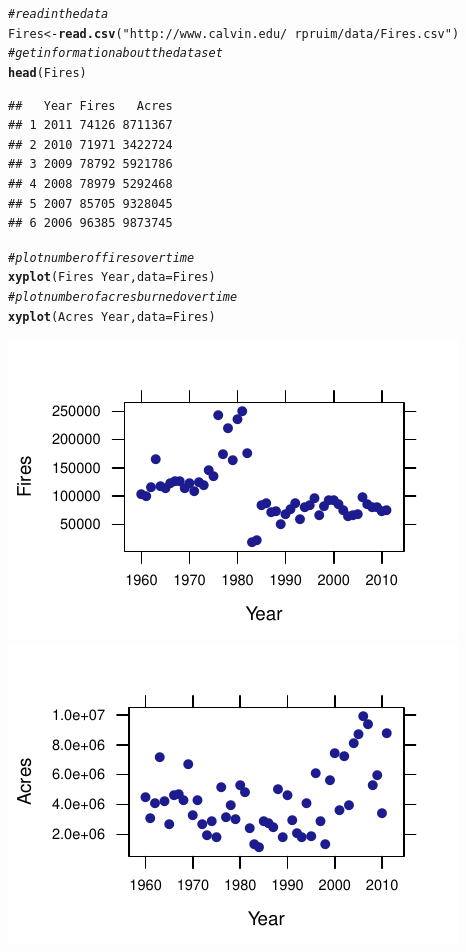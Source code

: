 \documentclass[twoside]{book}\usepackage[]{graphicx}\usepackage[]{xcolor}
\makeatletter
\def\maxwidth{ %
  \ifdim\Gin@nat@width>\linewidth
    \linewidth
  \else
    \Gin@nat@width
  \fi
}
\newcommand{\hlstr}[1]{\textcolor[rgb]{0.192,0.494,0.8}{#1}}%
\newcommand{\hlcom}[1]{\textcolor[rgb]{0.678,0.584,0.686}{\textit{#1}}}%
\newcommand{\hlopt}[1]{\textcolor[rgb]{0,0,0}{#1}}%
\newcommand{\hlstd}[1]{\textcolor[rgb]{0.345,0.345,0.345}{#1}}%
\newcommand{\hlkwb}[1]{\textcolor[rgb]{0.69,0.353,0.396}{#1}}%
\newcommand{\hlkwc}[1]{\textcolor[rgb]{0.333,0.667,0.333}{#1}}%
\newcommand{\hlkwd}[1]{\textcolor[rgb]{0.737,0.353,0.396}{\textbf{#1}}}%
\newenvironment{kframe}{%
 \def\at@end@of@kframe{}%
 \ifinner\ifhmode%
  \def\at@end@of@kframe{\end{minipage}}%
  \begin{minipage}{\columnwidth}%
 \fi\fi%
 \def\FrameCommand##1{\hskip\@totalleftmargin \hskip-\fboxsep
 \colorbox{shadecolor}{##1}\hskip-\fboxsep
     \hskip-\linewidth \hskip-\@totalleftmargin \hskip\columnwidth}%
 \MakeFramed {\advance\hsize-\width
   \@totalleftmargin\z@ \linewidth\hsize
   \@setminipage}}%
 {\par\unskip\endMakeFramed%
 \at@end@of@kframe}
\newenvironment{knitrout}{}{} %
\makeatother
\begin{document}
\begin{solution}

\begin{knitrout}
\color{fgcolor}\begin{kframe}
\begin{alltt}
\hlcom{# read in the data}
\hlstd{Fires} \hlkwb{<-} \hlkwd{read.csv}\hlstd{(}\hlstr{"http://www.calvin.edu/~rpruim/data/Fires.csv"}\hlstd{)}
\hlcom{# get information about the dataset}
\hlkwd{head}\hlstd{(Fires)}
\end{alltt}
\begin{verbatim}
##   Year Fires   Acres
## 1 2011 74126 8711367
## 2 2010 71971 3422724
## 3 2009 78792 5921786
## 4 2008 78979 5292468
## 5 2007 85705 9328045
## 6 2006 96385 9873745
\end{verbatim}
\begin{alltt}
\hlcom{# plot number of fires over time}
\hlkwd{xyplot}\hlstd{(Fires} \hlopt{~} \hlstd{Year,} \hlkwc{data} \hlstd{= Fires)}
\hlcom{# plot number of acres burned over time}
\hlkwd{xyplot}\hlstd{(Acres} \hlopt{~} \hlstd{Year,} \hlkwc{data} \hlstd{= Fires)}
\end{alltt}
\end{kframe}

{\centering \includegraphics[width=\maxwidth]{figures/fig-unnamed-chunk-31-1} 
\includegraphics[width=\maxwidth]{figures/fig-unnamed-chunk-31-2} 

}
\end{knitrout}
\end{solution}
\end{document}
